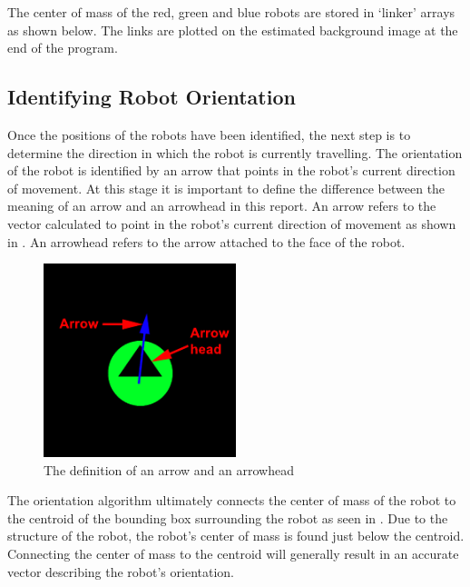 \documentclass{article}
\begin{document}
The center of mass of the red, green and blue robots are stored in `linker' arrays as shown below. The links are plotted on the estimated background image at the end of the program.\\



\subsection{Identifying Robot Orientation}
\label{sec:direction}
Once the positions of the robots have been identified, the next step is to determine the direction in which the robot is currently travelling. The orientation of the robot is identified by an arrow that points in the robot's current direction of movement. At this stage it is important to define the difference between the meaning of an arrow and an arrowhead in this report. An arrow refers to the vector calculated to point in the robot's current direction of movement as shown in . An arrowhead refers to the arrow attached to the face of the robot. 

\begin{figure}[h!]
	\centering
		\includegraphics[width=0.5\textwidth]{../Drawings/arrowvariation.pdf}
	\caption{The definition of an arrow and an arrowhead}
	\label{fig:def}
\end{figure}

The orientation algorithm ultimately connects the center of mass of the robot to the centroid of the bounding box surrounding the robot as seen in . Due to the structure of the robot, the robot's center of mass is found just below the centroid. Connecting the center of mass to the centroid will generally result in an accurate vector describing the robot's orientation.\\
\end{document}
